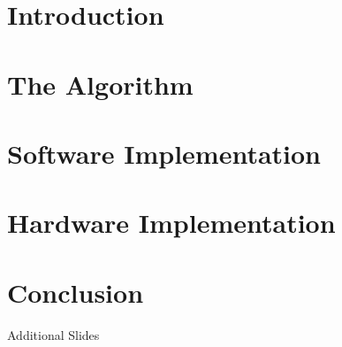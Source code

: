 \documentclass{beamer}
\begin{document}
\frame[label=titlepage,shrink]{\titlepage}

\section{Introduction}


\section{The Algorithm}


\section{Software Implementation}


\section{Hardware Implementation}


\section{Conclusion}


\appendix
\begin{frame}[label=additional]\relax
    {\Huge Additional Slides}
\end{frame}

\end{document}
